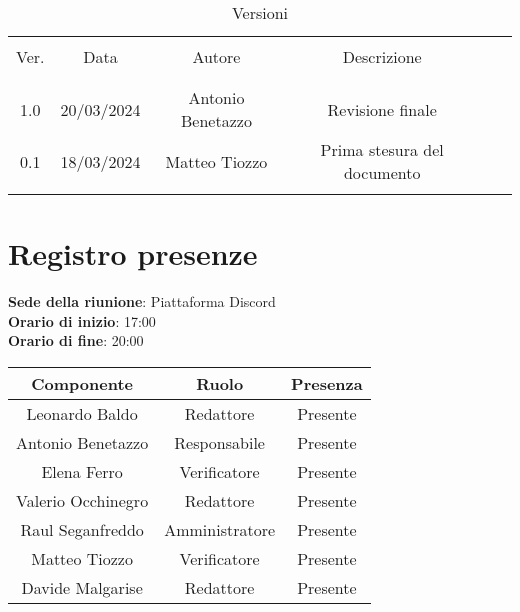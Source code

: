 \documentclass[italian,12pt]{article} %
\begin{document}


\newpage





\begin{table}[!h]
	\caption{Versioni}
	\begin{center}
		\begin{tabular}{ c c c c c c }
			\hline \\[-2ex]
			Ver. & Data & Autore & Descrizione \\
			\\[-2ex] \hline \\[-1.5ex]	
			1.0 & 20/03/2024 & Antonio Benetazzo & Revisione finale \\
			0.1 & 18/03/2024 & Matteo Tiozzo & Prima stesura del documento \\
			\\[-1.5ex] \hline
		\end{tabular}
	\end{center}
\end{table}
\newpage

\tableofcontents

\newpage

\section{Registro presenze}


\textbf{Sede della riunione}: Piattaforma Discord\\
\textbf{Orario di inizio}: 17:00\\
\textbf{Orario di fine}: 20:00\\

\begin{flushleft}
\begin{table}[!h]
\begin{tabular}{ |c|c|c| } 
	\hline
	\textbf{Componente} & \textbf{Ruolo} & \textbf{Presenza} \\
	\hline 
	Leonardo Baldo 		& Redattore & Presente \\ 
	Antonio Benetazzo 	& Responsabile & Presente \\
	Elena Ferro 		& Verificatore & Presente \\
	Valerio Occhinegro 	& Redattore & Presente \\
	Raul Seganfreddo 	& Amministratore & Presente \\
	Matteo Tiozzo 		& Verificatore & Presente \\ 
	Davide Malgarise 	& Redattore & Presente \\
	\hline
\end{tabular}
\end{table}
\end{flushleft}
\end{document}
